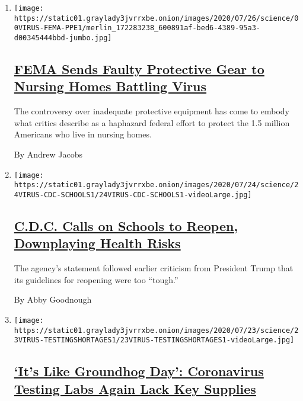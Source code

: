 \begin{enumerate}
\def\labelenumi{\arabic{enumi}.}
\item
  \texttt{[image: https://static01.graylady3jvrrxbe.onion/images/2020/07/26/science/00VIRUS-FEMA-PPE1/merlin\_172283238\_600891af-bed6-4389-95a3-d00345444bbd-jumbo.jpg]}

  \hypertarget{fema-sends-faulty-protective-gear-to-nursing-homes-battling-virus}{%
  \subsection{\texorpdfstring{\href{/2020/07/24/health/coronavirus-nursing-homes-PPE.html}{FEMA
  Sends Faulty Protective Gear to Nursing Homes Battling
  Virus}}{FEMA Sends Faulty Protective Gear to Nursing Homes Battling Virus}}\label{fema-sends-faulty-protective-gear-to-nursing-homes-battling-virus}}

  The controversy over inadequate protective equipment has come to
  embody what critics describe as a haphazard federal effort to protect
  the 1.5 million Americans who live in nursing homes.

  By Andrew Jacobs
\item
  \texttt{[image: https://static01.graylady3jvrrxbe.onion/images/2020/07/24/science/24VIRUS-CDC-SCHOOLS1/24VIRUS-CDC-SCHOOLS1-videoLarge.jpg]}

  \hypertarget{cdc-calls-on-schools-to-reopen-downplaying-health-risks}{%
  \subsection{\texorpdfstring{\href{/2020/07/24/health/cdc-schools-coronavirus.html}{C.D.C.
  Calls on Schools to Reopen, Downplaying Health
  Risks}}{C.D.C. Calls on Schools to Reopen, Downplaying Health Risks}}\label{cdc-calls-on-schools-to-reopen-downplaying-health-risks}}

  The agency's statement followed earlier criticism from President Trump
  that its guidelines for reopening were too ``tough.''

  By Abby Goodnough
\item
  \texttt{[image: https://static01.graylady3jvrrxbe.onion/images/2020/07/23/science/23VIRUS-TESTINGSHORTAGES1/23VIRUS-TESTINGSHORTAGES1-videoLarge.jpg]}

  \hypertarget{its-like-groundhog-day-coronavirus-testing-labs-again-lack-key-supplies}{%
  \subsection{\texorpdfstring{\href{/2020/07/23/health/coronavirus-testing-supply-shortage.html}{`It's
  Like Groundhog Day': Coronavirus Testing Labs Again Lack Key
  Supplies}}{`It's Like Groundhog Day': Coronavirus Testing Labs Again Lack Key Supplies}}\label{its-like-groundhog-day-coronavirus-testing-labs-again-lack-key-supplies}}


\end{enumerate}
